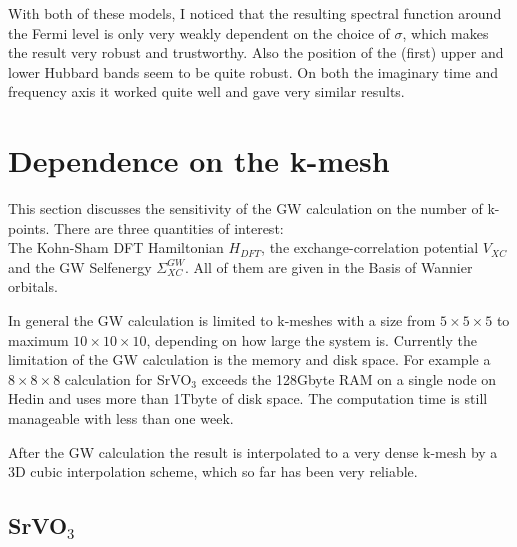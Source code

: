 \documentclass[12pt,a4paper]{scrartcl}
\numberwithin{equation}{section}
\begin{document}
With both of these models, I noticed that the resulting spectral
function around the Fermi level is only very weakly dependent on the choice
of $\sigma$, which makes the result very robust and trustworthy.  
Also the position of the (first) upper and lower Hubbard bands seem to be 
quite robust. On both the imaginary time and frequency axis it worked quite well
and gave very similar results.



\clearpage

\section{Dependence on the k-mesh}

This section discusses the sensitivity of the GW calculation on the number of
k-points. There are three quantities of interest:\\
The Kohn-Sham DFT Hamiltonian $H_{DFT}$, the exchange-correlation
potential $V_{XC}$  and the GW Selfenergy $\Sigma^{GW}_{XC}$.
All of them are given in the Basis of Wannier orbitals.

In general the GW calculation is limited to k-meshes with a size from
$5\times 5\times 5$ to maximum $10\times 10\times 10$, depending on how large the system
is. Currently the limitation of the GW calculation is the memory and disk space.
For example a $8\times 8\times 8$ calculation for SrVO$_3$ exceeds the 128Gbyte
RAM on a single node on Hedin and uses more than 1Tbyte of disk space.
The computation time is still manageable with less than one week.

After the GW calculation the result is interpolated to a very dense k-mesh
by a 3D cubic interpolation scheme, which so far has been very reliable.

\clearpage

\subsection{SrVO$_3$}
\end{document}
